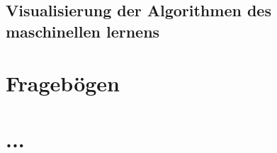 \begin{appendix}
\subsection{Visualisierung der Algorithmen des maschinellen lernens}



\section{Fragebögen}


\section{...}


\end{appendix}
